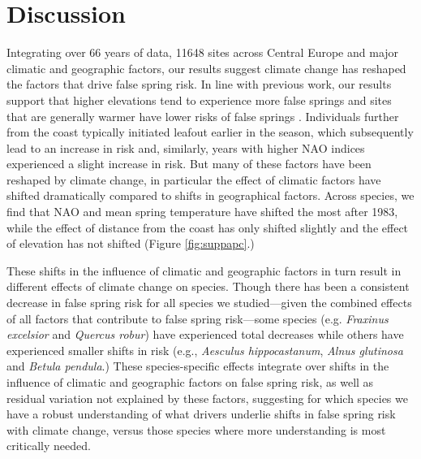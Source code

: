 \documentclass{article}\usepackage[]{graphicx}\usepackage[]{color}
\begin{document}
\section*{Discussion}
Integrating over 66 years of data, 11648 sites across Central Europe and major climatic and geographic factors, our results suggest climate change has reshaped the factors that drive false spring risk. In line with previous work, our results support that higher elevations tend to experience more false springs \citep{Vitasse2018, Vitra2017} and sites that are generally warmer have lower risks of false springs \citep{Wypych2016}. Individuals further from the coast typically initiated leafout earlier in the season, which subsequently lead to an increase in risk and, similarly, years with higher NAO indices experienced a slight increase in risk. But many of these factors have been reshaped by climate change, in particular the effect of climatic factors have shifted dramatically compared to shifts in geographical factors. Across species, we find that NAO and mean spring temperature have shifted the most after 1983, while the effect of distance from the coast has only shifted slightly and the effect of elevation has not shifted (Figure \ref{fig:suppapc}.) 

These shifts in the influence of climatic and geographic factors in turn result in different effects of climate change on species. Though there has been a consistent decrease in false spring risk for all species we studied---given the combined effects of all factors that contribute to false spring risk---some species (e.g. \textit{Fraxinus excelsior} and \textit{Quercus robur}) have experienced total decreases while others have experienced smaller shifts in risk (e.g., \textit{Aesculus hippocastanum}, \textit{Alnus glutinosa} and \textit{Betula pendula}.) These species-specific effects integrate over shifts in the influence of climatic and geographic factors on false spring risk, as well as residual variation not explained by these factors, suggesting for which species we have a robust understanding of what drivers underlie shifts in false spring risk with climate change, versus those species where more understanding is most critically needed. 
\end{document}

